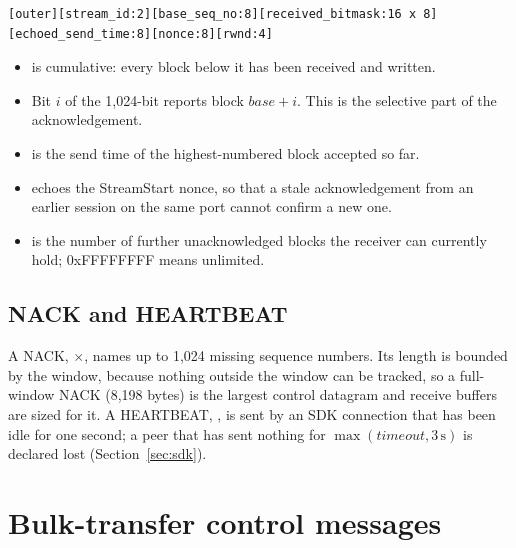\begin{lstlisting}
[outer][stream_id:2][base_seq_no:8][received_bitmask:16 x 8][echoed_send_time:8][nonce:8][rwnd:4]
\end{lstlisting}

\begin{itemize}
  \item {} is cumulative: every block below it has been received and written.
  \item Bit $i$ of the 1,024-bit  reports block $\mathit{base}+i$. This is the selective
    part of the acknowledgement.
  \item {} is the send time of the highest-numbered block accepted so far.
  \item {} echoes the StreamStart nonce, so that a stale acknowledgement from an earlier session on
    the same port cannot confirm a new one.
  \item {}\vviii{} is the number of further unacknowledged blocks the receiver can currently hold;
    0xFFFFFFFF means unlimited.
\end{itemize}

\subsection{NACK and HEARTBEAT}

A NACK, $\times$, names up to 1,024
missing sequence numbers. Its length is bounded by the window, because nothing outside the window can be
tracked, so a full-window NACK (8,198 bytes) is the largest control datagram and receive buffers are sized for
it. A HEARTBEAT, , is sent by an SDK connection that has been idle
for one second; a peer that has sent nothing for $\max(\mathit{timeout},3\,\mathrm{s})$ is declared lost
(Section~\ref{sec:sdk}).

\section{Bulk-transfer control messages}

